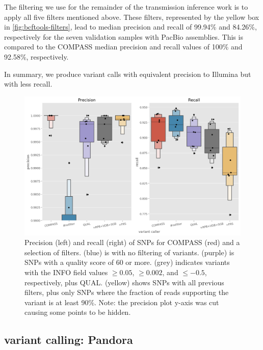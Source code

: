 The filtering we use for the remainder of the transmission inference
work is to apply all five filters mentioned above. These filters, represented by the yellow box in \autoref{fig:bcftools-filters}, lead to median precision and recall of 99.94\% and 84.26\%, respectively for the seven validation samples with PacBio assemblies. This is compared to the COMPASS median precision and recall values of 100\% and 92.58\%, respectively.

In summary, we produce \ont{} variant calls with equivalent precision to Illumina but with less recall.

\begin{figure}
\begin{center}
\includegraphics[width=0.90\columnwidth]{Chapter2/Figs/bcftools-precision-recall-filters.png}
\caption{{Precision (left) and recall (right) of SNPs for COMPASS (red) and a selection of \bcftools{} filters.  (blue) is \bcftools{} with no filtering of variants.  (purple) is \bcftools{} SNPs with a quality score of 60 or more.  (grey) indicates \bcftools{} variants with the INFO field values $\ge 0.05$, $\ge 0.002$, and $\le -0.5$, respectively, plus QUAL.  (yellow) shows \bcftools{} SNPs with all previous filters, plus only SNPs where the fraction of reads supporting the variant is at least 90\%. Note: the precision plot y-axis was cut causing some  points to be hidden.
{\label{fig:bcftools-filters}}
}}
\end{center}
\end{figure}

\subsection{\ont{} variant calling: Pandora}
\label{sec:pandora-filters}


